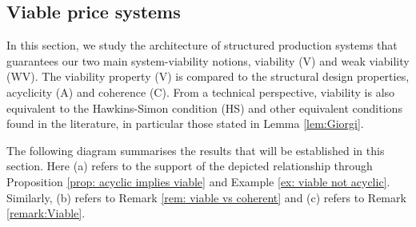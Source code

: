 \documentclass[11pt,fleqn]{article}
\begin{document}
\subsection{Viable price systems}\label{sec: viable}

In this section, we study the architecture of structured production systems that guarantees our two main system-viability notions, viability (V) and weak viability (WV). The viability property (V) is compared to the structural design properties, acyclicity (A) and coherence (C). From a technical perspective, viability is also equivalent to the Hawkins-Simon condition (HS) and other equivalent conditions found in the literature, in particular those stated in Lemma \ref{lem:Giorgi}. 
 
The following diagram summarises the results that will be established in this section. Here (a) refers to the support of the depicted relationship through Proposition \ref{prop: acyclic implies viable} and Example \ref{ex: viable not acyclic}. Similarly, (b) refers to Remark \ref{rem: viable vs coherent} and (c) refers to Remark \ref{remark:Viable}.
 
\end{document}
